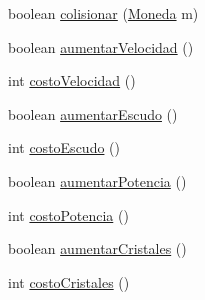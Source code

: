 \begin{DoxyCompactItemize}
\item 
boolean \hyperlink{classBatallaEspacial_1_1Player_aa0232bdde5b15f840b17e531417f2d24}{colisionar} (\hyperlink{classBatallaEspacial_1_1Moneda}{Moneda} m)
\item 
boolean \hyperlink{classBatallaEspacial_1_1Player_a29f607159f93374961c1ee54fa1abd7b}{aumentarVelocidad} ()
\item 
int \hyperlink{classBatallaEspacial_1_1Player_afed4722e91c07e9b918bd3c3460f7759}{costoVelocidad} ()
\item 
boolean \hyperlink{classBatallaEspacial_1_1Player_a1f3835d9aa97dfe9fe0e2f660e1929c4}{aumentarEscudo} ()
\item 
int \hyperlink{classBatallaEspacial_1_1Player_a5a524ca02b1ec19c2fa270b83c158670}{costoEscudo} ()
\item 
boolean \hyperlink{classBatallaEspacial_1_1Player_a2eecee86c3f24c3131ef32b1c2cb4140}{aumentarPotencia} ()
\item 
int \hyperlink{classBatallaEspacial_1_1Player_a5fede75873118fbcbdc4e432ae2fe866}{costoPotencia} ()
\item 
boolean \hyperlink{classBatallaEspacial_1_1Player_a90f4e490e1ad74edc2a42151fd9cc4de}{aumentarCristales} ()
\item 
int \hyperlink{classBatallaEspacial_1_1Player_a2774240ece771ad7b8bfa4b0665b9eba}{costoCristales} ()
\end{DoxyCompactItemize}
